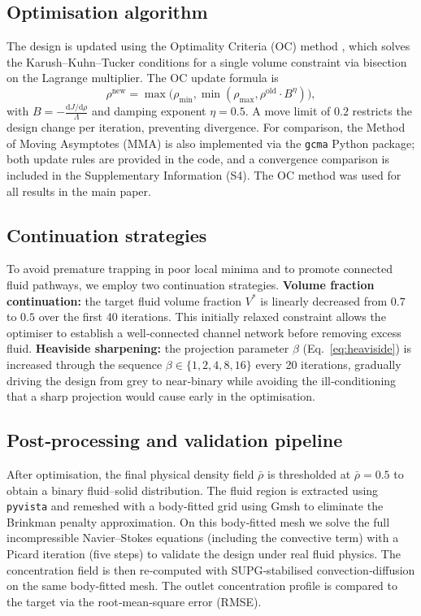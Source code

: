 \documentclass[12pt]{article}
\begin{document}
\subsection{Optimisation algorithm}
The design is updated using the Optimality Criteria (OC) method \cite{bendsoe2003}, which solves the Karush–Kuhn–Tucker conditions for a single volume constraint via bisection on the Lagrange multiplier. The OC update formula is
\begin{equation}
\rho^{\text{new}} = \max\bigl(\rho_{\min}, \min(\rho_{\max}, \rho^{\text{old}} \cdot B^\eta)\bigr),
\end{equation}
with $B = -\frac{\mathrm{d}J/\mathrm{d}\rho}{\Lambda}$ and damping exponent $\eta = 0.5$. A move limit of $0.2$ restricts the design change per iteration, preventing divergence. For comparison, the Method of Moving Asymptotes (MMA) \cite{svanberg1987} is also implemented via the \texttt{gcma} Python package; both update rules are provided in the code, and a convergence comparison is included in the Supplementary Information (S4). The OC method was used for all results in the main paper.

\subsection{Continuation strategies}
To avoid premature trapping in poor local minima and to promote connected fluid pathways, we employ two continuation strategies. \textbf{Volume fraction continuation:} the target fluid volume fraction $V^*$ is linearly decreased from $0.7$ to $0.5$ over the first 40 iterations. This initially relaxed constraint allows the optimiser to establish a well‑connected channel network before removing excess fluid. \textbf{Heaviside sharpening:} the projection parameter $\beta$ (Eq.~\eqref{eq:heaviside}) is increased through the sequence $\beta \in \{1,2,4,8,16\}$ every 20 iterations, gradually driving the design from grey to near‑binary while avoiding the ill‑conditioning that a sharp projection would cause early in the optimisation.

\subsection{Post‑processing and validation pipeline}
After optimisation, the final physical density field $\bar{\rho}$ is thresholded at $\bar{\rho} = 0.5$ to obtain a binary fluid–solid distribution. The fluid region is extracted using \texttt{pyvista} and remeshed with a body‑fitted grid using Gmsh \cite{geuzaine2009} to eliminate the Brinkman penalty approximation. On this body‑fitted mesh we solve the full incompressible Navier–Stokes equations (including the convective term) with a Picard iteration (five steps) to validate the design under real fluid physics. The concentration field is then re‑computed with SUPG‑stabilised convection‑diffusion on the same body‑fitted mesh. The outlet concentration profile is compared to the target via the root‑mean‑square error (RMSE).
\end{document}
